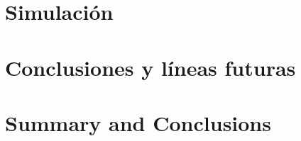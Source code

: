\documentclass[spanish,a4paper,11pt,oneside]{extreport}
\begin{document}
\chapter{\LARGE Simulación}
\label{chapter:cuatro}




\newpage
\thispagestyle{empty}
\vspace*{\fill}
\begin{center}
\end{center}
\vspace*{\fill}
\newpage


\newpage{\pagestyle{empty}}
\thispagestyle{empty}

\chapter{\LARGE Conclusiones y líneas futuras}
\label{chapter:conclusiones}




\newpage
\thispagestyle{empty}
\vspace*{\fill}
\begin{center}
\end{center}
\vspace*{\fill}
\newpage

\newpage{\pagestyle{empty}}
\thispagestyle{empty}

\chapter{\LARGE Summary and Conclusions}
\label{chapter:conclusions}




\newpage
\thispagestyle{empty}
\vspace*{\fill}
\begin{center}
\end{center}
\vspace*{\fill}
\newpage
\end{document}
